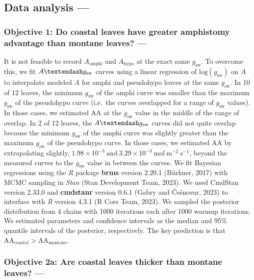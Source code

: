 \documentclass[
  letterpaper,
  DIV=11,
  numbers=noendperiod]{scrartcl}
\begin{document}
\hypertarget{data-analyis}{%
\subsection{Data analysis ---}\label{data-analyis}}

\hypertarget{objective-1-do-coastal-leaves-have-greater-amphistomy-advantage-than-montane-leaves}{%
\subsubsection{Objective 1: Do coastal leaves have greater amphistomy
advantage than montane leaves?
---}\label{objective-1-do-coastal-leaves-have-greater-amphistomy-advantage-than-montane-leaves}}

It is not feasible to record \(A_\mathrm{amphi}\) and
\(A_\mathrm{hypo}\) at the exact same \(g_\text{sw}\). To overcome this,
we fit \(A \textendash g_\text{sw}\) curves using a linear regression of
\(\text{log}(g_\mathrm{sw})\) on \(A\) to interpolate modeled \(A\) for
amphi and pseudohypo leaves at the same \(g_\text{sw}\). In 10 of 12
leaves, the minimum \(g_\text{sw}\) of the amphi curve was smaller than
the maximum \(g_\text{sw}\) of the pseudohypo curve (i.e.~the curves
overlapped for a range of \(g_\text{sw}\) values). In those cases, we
estimated \(\mathrm{AA}\) at the \(g_\mathrm{sw}\) value in the middle
of the range of overlap. In 2 of 12 leaves, the
\(A \textendash g_\text{sw}\) curves did not quite overlap because the
minimum \(g_\text{sw}\) of the amphi curve was slightly greater than the
maximum \(g_\text{sw}\) of the pseudohypo curve. In those cases, we
estimated \(\mathrm{AA}\) by extrapolating slightly,
\(1.98\times 10^{-3}~\text{and}~3.29\times 10^{-3}~\text{mol}~\text{m}^{-2}~\text{s}^{-1}\),
beyond the measured curves to the \(g_\mathrm{sw}\) value in between the
curves. We fit Bayesian regressions using the \emph{R} package
\textbf{brms} version 2.20.1 (Bürkner, 2017) with MCMC sampling in
\emph{Stan} (Stan Development Team, 2023). We used CmdStan version
2.33.0 and \textbf{cmdstanr} version 0.6.1 (Gabry and Češnovar, 2023) to
interface with \emph{R} version 4.3.1 (R Core Team, 2023). We sampled
the posterior distribution from 4 chains with 1000 iterations each after
1000 warmup iterations. We estimated parameters and confidence intervals
as the median and 95\% quantile intervals of the posterior,
respectively. The key prediction is that
\(\mathrm{AA}_\text{coastal} > \mathrm{AA}_\text{montane}\).

\hypertarget{objective-2a-are-coastal-leaves-thicker-than-montane-leaves}{%
\subsubsection{Objective 2a: Are coastal leaves thicker than montane
leaves?
---}\label{objective-2a-are-coastal-leaves-thicker-than-montane-leaves}}
\end{document}
